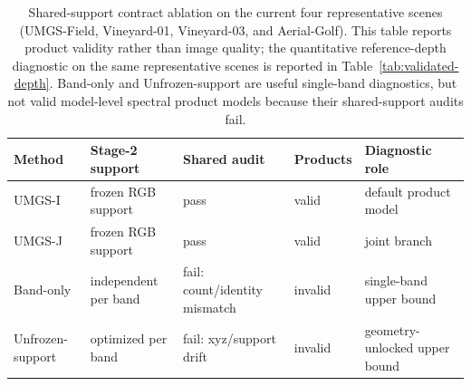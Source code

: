 \begin{table}[!t]
    \caption{Shared-support contract ablation on the current four representative scenes (UMGS-Field, Vineyard-01, Vineyard-03, and Aerial-Golf). This table reports product validity rather than image quality; the quantitative reference-depth diagnostic on the same representative scenes is reported in Table~\ref{tab:validated-depth}. Band-only and Unfrozen-support are useful single-band diagnostics, but not valid model-level spectral product models because their shared-support audits fail.}
    \label{tab:ablations3}
    \centering
    \scriptsize
    \setlength{\tabcolsep}{3pt}
    \begin{tabular}{p{}p{}p{}p{}p{}}
        \toprule
        Method & Stage-2 support & Shared audit & Products & Diagnostic role \\
        \midrule
        UMGS-I & frozen RGB support & pass & valid & default product model \\
        UMGS-J & frozen RGB support & pass & valid & joint branch \\
        Band-only & independent per band & fail: count/identity mismatch & invalid & single-band upper bound \\
        Unfrozen-support & optimized per band & fail: xyz/support drift & invalid & geometry-unlocked upper bound \\
        \bottomrule
    \end{tabular}
\end{table}
